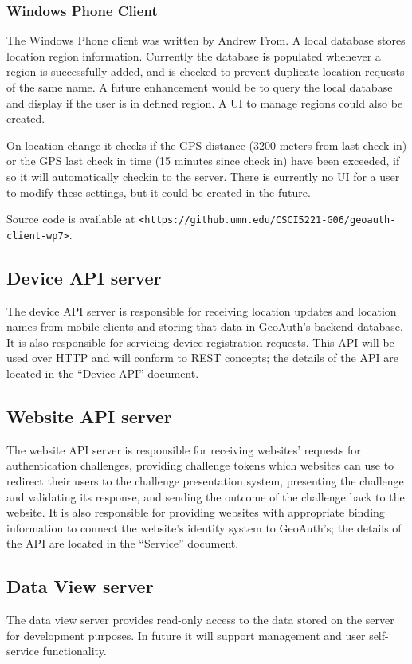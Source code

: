 \documentclass[11pt]{article} %
\begin{document}
\subsubsection{Windows Phone Client}
The Windows Phone client was written by Andrew From. A local database stores location region information. Currently the database is populated whenever a region is successfully added, and is checked to prevent duplicate location requests of the same name. A future enhancement would be to query the local database and display if the user is in defined region. A UI to manage regions could also be created.

On location change it checks if the GPS distance (3200 meters from last check in) or the GPS last check in time (15 minutes since check in) have been exceeded, if so it will automatically checkin to the server. There is currently no UI for a user to modify these settings, but it could be created in the future.

Source code is available at \texttt{<https://github.umn.edu/CSCI5221-G06/geoauth-client-wp7>}.

\subsection{Device API server}
The device API server is responsible for receiving location updates and location names from mobile clients and storing that data in GeoAuth's backend database. It is also responsible for servicing device registration requests. This API will be used over HTTP and will conform to REST concepts; the details of the API are located in the ``Device API'' document.

\subsection{Website API server}
The website API server is responsible for receiving websites' requests for authentication challenges, providing challenge tokens which websites can use to redirect their users to the challenge presentation system, presenting the challenge and validating its response, and sending the outcome of the challenge back to the website. It is also responsible for providing websites with appropriate binding information to connect the website's identity system to GeoAuth's; the details of the API are located in the ``Service'' document.

\subsection{Data View server}
The data view server provides read-only access to the data stored on the server for development purposes. In future it will support management and user self-service functionality.
\end{document}
